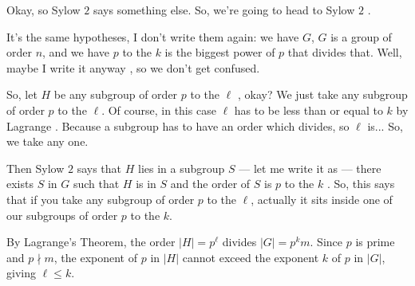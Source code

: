 \begin{speech}[00:17:03 - 00:18:39]
Okay, so Sylow $2$ says something else. So, we're going to head to Sylow $2$ .

It's the same hypotheses, I don't write them again: we have $G$, $G$ is a group of order $n$, and we have $p$ to the $k$ is the biggest power of $p$ that divides that. Well, maybe I write it anyway , so we don't get confused.

So, let $H$ be any subgroup of order $p$ to the $\ell$ , okay? We just take any subgroup of order $p$ to the $\ell$. Of course, in this case $\ell$ has to be less than or equal to $k$ by Lagrange . Because a subgroup has to have an order which divides, so $\ell$ is... So, we take any one.

Then Sylow $2$ says that $H$ lies in a subgroup $S$ --- let me write it as  --- there exists $S$ in $G$  such that $H$ is in $S$ and the order of $S$ is $p$ to the $k$ . So, this says that if you take any subgroup of order $p$ to the $\ell$, actually it sits inside one of our subgroups of order $p$ to the $k$.
\end{speech}

\begin{content}

\begin{steps}[Why Lagrange's Theorem Forces \texorpdfstring{$\ell \le k$}{l <= k}]
By Lagrange's Theorem, the order $|H| = p^\ell$ divides $|G| = p^k m$. Since $p$ is prime and $p \nmid m$, the exponent of $p$ in $|H|$ cannot exceed the exponent $k$ of $p$ in $|G|$, giving $\ell \le k$.
\end{steps}
\end{content}


